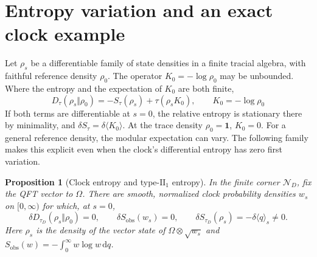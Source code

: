 \documentclass[11pt,a4paper]{article}
\numberwithin{equation}{section}
\newtheorem{proposition}{Proposition}[section]
\theoremstyle{remark}
\newcommand{\N}{\mathcal N}
\newcommand{\dd}{\mathrm d}
\newcommand{\Sobs}{S_{\mathrm{obs}}}
\newcommand{\one}{\mathbf 1}
\begin{document}
\section{Entropy variation and an exact clock example}
\label{sec:entropy}

Let $\rho_s$ be a differentiable family of state densities in a finite tracial algebra, with faithful reference density $\rho_0$. The operator $K_0=-\log\rho_0$ may be unbounded. Where the entropy and the expectation of $K_0$ are both finite,
\begin{equation}
 D_\tau(\rho_s\Vert\rho_0)
   =-S_\tau(\rho_s)+\tau(\rho_sK_0),\qquad K_0=-\log\rho_0
 \label{eq:first-law}
\end{equation}
If both terms are differentiable at $s=0$, the relative entropy is stationary there by minimality, and $\delta S_\tau=\delta\langle K_0\rangle$. At the trace density $\rho_0=\one$, $K_0=0$. For a general reference density, the modular expectation can vary. The following family makes this explicit even when the clock's differential entropy has zero first variation.

\begin{proposition}[Clock entropy and type-$\mathrm{II}_1$ entropy]
\label{prop:clock}
In the finite corner $\N_D$, fix the QFT vector to $\Omega$. There are smooth, normalized clock probability densities $w_s$ on $[0,\infty)$ for which, at $s=0$,
\begin{equation}
 \delta D_{\tau_D}(\rho_s\Vert\rho_0)=0,\qquad
 \delta\Sobs(w_s)=0,\qquad
 \delta S_{\tau_D}(\rho_s)=-\delta\langle q\rangle_s\ne0.
 \label{eq:counter}
\end{equation}
Here $\rho_s$ is the density of the vector state of $\Omega\otimes\sqrt{w_s}$ and $\Sobs(w)=-\int_0^\infty w\log w\,\dd q$.
\end{proposition}
\end{document}
